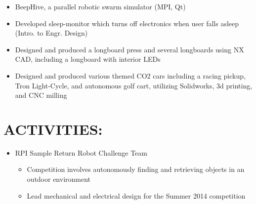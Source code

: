 \begin{resume}
\vspace{7mm}
\begin{itemize}
  \item BeepHive, a parallel robotic swarm simulator (MPI, Qt)
  \item Developed sleep-monitor which turns off electronics when user falls asleep (Intro. to Engr. Design)
  \item Designed and produced a longboard press and several longboards using NX CAD, including a longboard
        with interior LEDs
  \item Designed and produced various themed CO2 cars including a racing pickup, Tron Light-Cycle,
        and autonomous golf cart, utilizing Solidworks, 3d printing, and CNC milling
\end{itemize}

\section{ACTIVITIES:}
	\begin{itemize}
    \item RPI Sample Return Robot Challenge Team
    \begin{itemize}
      \item Competition involves autonomously finding and retrieving objects in an outdoor environment
      \item Lead mechanical and electrical design for the Summer 2014 competition
    \end{itemize}
	\end{itemize}
\end{resume} 

